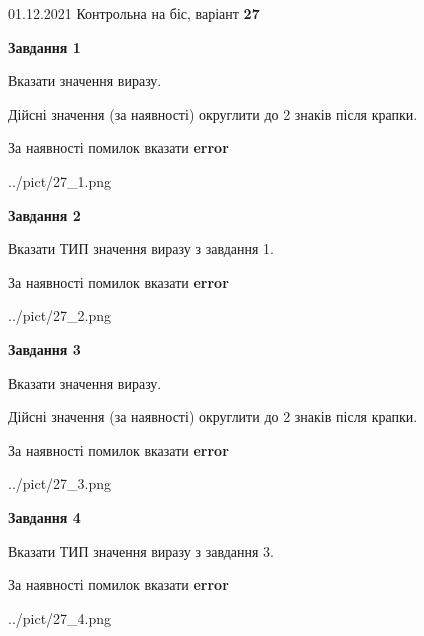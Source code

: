 \documentclass[11pt, ukrainian]{article}
\begin{document}
{01.12.2021 Контрольна на біс, варіант  \No \textbf { 27 }\par}
{
\begin {large}
{\begin {center}\textbf{Завдання 1}\end {center}}\par
Вказати значення виразу. \par
Дійсні значення (за наявності) округлити до 2 знаків після крапки. \par
За наявності помилок вказати \textbf{error}

\begin{center}
	{../pict/27_1.png}
\end{center}
\newpage

{\begin {center}\textbf{Завдання 2}\end {center}}\par
Вказати ТИП значення виразу з завдання 1. \par
За наявності помилок вказати \textbf{error}

\begin{center}
	{../pict/27_2.png}
\end{center}
\newpage

{\begin {center}\textbf{Завдання 3}\end {center}}\par
Вказати значення виразу. \par
Дійсні значення (за наявності) округлити до 2 знаків після крапки. \par
За наявності помилок вказати \textbf{error}

\begin{center}
	{../pict/27_3.png}
\end{center}
\newpage

{\begin {center}\textbf{Завдання 4}\end {center}}\par
Вказати ТИП значення виразу з завдання 3. \par
За наявності помилок вказати \textbf{error}

\begin{center}
	{../pict/27_4.png}
\end{center}
\newpage


\end{large}}
\end{document}
